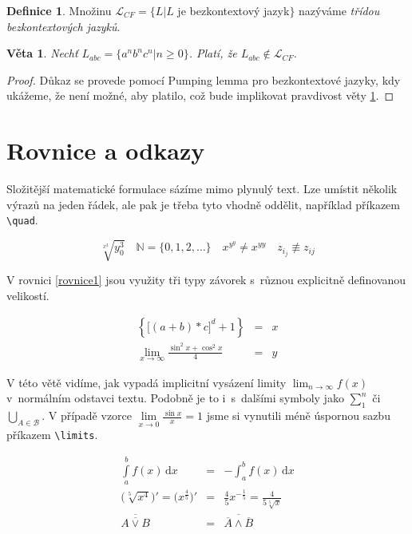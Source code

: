 \documentclass[11pt, a4paper, twocolumn]{article}
\theoremstyle{definition}
\newtheorem{definice}{Definice}[section]
\theoremstyle{plain}
\newtheorem{veta}{Věta}
\begin{document}
	\begin{definice}
	Množinu $\mathcal{L}_{CF} = \{L|L$ je bezkontextový jazyk$\}$ nazýváme \emph{třídou bezkontextových jazyků}.
	\end{definice}

	\begin{veta} \label{veta1}
	Nechť $L_{abc} = \{a^n b^n c^n | n \geq 0\}$. Platí, že $L_{abc} \notin \mathcal{L}_{CF}$.
	\end{veta}

	\begin{proof}
	Důkaz se provede pomocí Pumping lemma pro bezkontextové jazyky, kdy ukážeme, že není možné, aby platilo, což bude implikovat pravdivost věty \ref{veta1}.
	\end{proof}

	\section{Rovnice a odkazy}
	Složitější matematické formulace sázíme mimo plynulý text. Lze umístit několik výrazů na jeden řádek, ale pak je třeba tyto vhodně oddělit, například příkazem \verb|\quad|. 

	$$\sqrt[x^2]{y^3_0} \quad \mathbb{N} = \{0,1,2,\ldots\} \quad x^{y^y} \neq x^{yy} \quad z_{i_j} \not\equiv z_{ij}$$

	V rovnici \eqref{rovnice1} jsou využity tři typy závorek s~různou explicitně definovanou velikostí.

	\begin{eqnarray} \label{rovnice1}
		\left\{ {\Big[ (a+b)*c \Big]}^d + 1 \right\} & = & x \\
		\lim_{x \to \infty} \frac{\sin^2 x + \cos^2 x}{4} & = & y \nonumber
	\end{eqnarray}

	V této větě vidíme, jak vypadá implicitní vysázení limity $\lim_{n \to \infty} f(x)$ v~normálním odstavci textu. Podobně je to i~s~dalšími symboly jako $\sum_{1}^{n}$ či $\bigcup_{A \in \mathcal{B}}$. V případě vzorce $\lim\limits_{x \to 0} \frac{\sin x}{x} = 1$ jsme si vynutili méně úspornou sazbu příkazem \verb|\limits|.

	\begin{eqnarray}
		\int\limits_{a}^{b} f(x)\,\mathrm{d}x & = & - \int_{a}^{b} f(x)\,\mathrm{d}x \\
		\Big(\sqrt[5]{x^4}\Big)' = \Big(x^{\frac{4}{5}}\Big)' & = & \frac{4}{5}x^{-\frac{1}{5}} = \frac{4}{5 \sqrt[5]{x}} \\
		\overline{\overline{A \vee B}} & = & \overline{\overline{A} \wedge \overline{B}}
	\end{eqnarray}
	
\end{document}

